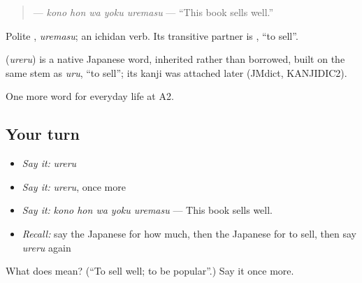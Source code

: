 \begin{quote}
\textbf{   } — \emph{kono hon wa yoku uremasu} — \textquotedblleft{}This book sells well.\textquotedblright{}
\end{quote}

Polite \textbf{}, \emph{uremasu}; an ichidan verb. Its transitive partner is \textbf{}, \textquotedblleft{}to sell\textquotedblright{}.

\begin{cousinweb}
\textbf{} (\emph{ureru}) is a native Japanese word, inherited rather than borrowed, built on the same stem as \emph{uru}, \textquotedblleft{}to sell\textquotedblright{}; its kanji was attached later (JMdict, KANJIDIC2).
\end{cousinweb}

\begin{grammarlens}[title={What you've built}]
One more word for everyday life at A2.
\end{grammarlens}

\subsection*{Your turn}
\begin{itemize}
\raggedright
  \item \emph{Say it:} \emph{ureru}
  \item \emph{Say it:} \emph{ureru}, once more
  \item \emph{Say it:} \emph{kono hon wa yoku uremasu} — This book sells well.
  \item \emph{Recall:} say the Japanese for how much, then the Japanese for to sell, then say \emph{ureru} again
\end{itemize}

\begin{tcolorbox}[breakable,colback=teal!4,colframe=teal!35!black,title={Before you move on}]
What does  mean? (\textquotedblleft{}To sell well; to be popular\textquotedblright{}.) Say it once more.
\end{tcolorbox}
